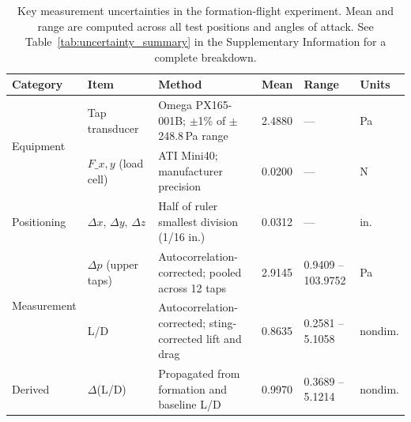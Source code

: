         \begin{table}[htbp]
        \centering
        \footnotesize
        \setlength{\tabcolsep}{4pt}
        \renewcommand{\arraystretch}{1.0}
        \caption{Key measurement uncertainties in the formation-flight experiment. Mean and range are computed across all test positions and angles of attack. See Table~\ref{tab:uncertainty_summary} in the Supplementary Information for a complete breakdown.}
        \label{tab:uncertainty_short}
        \begin{tabular}{p{1.6cm} p{2.0cm} p{3.5cm} p{1.1cm} p{2.0cm} p{1.1cm}}
        \hline
        \textbf{Category} & \textbf{Item} & \textbf{Method} & \textbf{Mean} & \textbf{Range} & \textbf{Units} \\
        \hline
        \multirow{2}{*}{Equipment} & Tap transducer & Omega PX165-001B; $\pm$1\% of $\pm$248.8\,Pa range & 2.4880 & --- & Pa \\
        \hline
         & $F\_{x,y}$ (load cell) & ATI Mini40; manufacturer precision & 0.0200 & --- & N \\
        \hline
        \multirow{1}{*}{Positioning} & $\Delta x,\, \Delta y,\, \Delta z$ & Half of ruler smallest division (1/16 in.) & 0.0312 & --- & in. \\
        \hline
        \multirow{2}{*}{Measurement} & $\Delta p$ (upper taps) & Autocorrelation-corrected; pooled across 12 taps & 2.9145 & 0.9409 -- 103.9752 & Pa \\
        \hline
         & L/D & Autocorrelation-corrected; sting-corrected lift and drag & 0.8635 & 0.2581 -- 5.1058 & nondim. \\
        \hline
        \multirow{1}{*}{Derived} & $\Delta$(L/D) & Propagated from formation and baseline L/D & 0.9970 & 0.3689 -- 5.1214 & nondim. \\
        \hline
        \end{tabular}
        \end{table}
